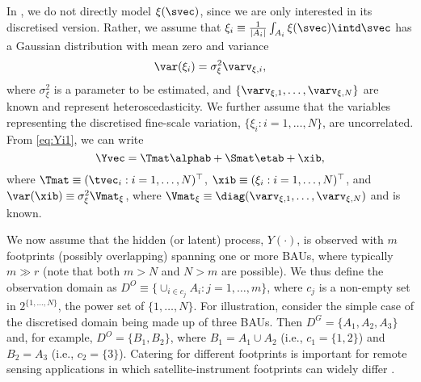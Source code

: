 In , we do not directly model $\xi(\svec)$, since we are only interested in its discretised version. Rather, we assume that $\xi_i \equiv \frac{1}{|A_i|}\int_{A_i} \xi(\svec)\intd\svec$ has a Gaussian distribution with mean zero and variance
\begin{equation*}
\var(\xi_i) = \sigma^2_\xi \varv_{\xi,i},
\end{equation*}
where $\sigma^2_\xi$ is a parameter to be estimated, and $\{\varv_{\xi,1},\dots,\varv_{\xi,N}\}$ are known and represent  heteroscedasticity. We further assume that the variables representing the discretised fine-scale variation, $\{\xi_i: i = 1,\dots,N\}$, are uncorrelated. From \eqref{eq:Yi1}, we can write
\begin{equation}\label{eq:SRE_Y}
\Yvec = \Tmat\alphab + \Smat\etab + \xib,
\end{equation}
where $\Tmat \equiv (\tvec_i: i = 1,\dots,N)^\top$, $\xib \equiv (\xi_i : i = 1,\dots,N)^\top$, and $\var(\xib) \equiv \sigma^2_\xi \Vmat_\xi$, where $\Vmat_\xi \equiv \diag(\varv_{\xi,1},\dots,\varv_{\xi,N})$ and is known.

We now  assume that the hidden (or latent) process, $Y(\cdot)$, is observed with $m$ footprints (possibly overlapping) spanning one or more BAUs, where typically $m \gg r$ (note that both $m > N$ and $N >m$ are possible). We thus define the observation domain as $D^O \equiv \{ \cup_{i \in c_j} A_i : j = 1,\dots,m \}$, where $c_j$ is a non-empty set in $2^{\{1,\dots,N\}}$, the power set of $\{1,\dots,N\}$. For illustration, consider the simple case of  the discretised domain being made up of three BAUs. Then $D^G = \{A_1,A_2,A_3\}$ and, for example, $D^O = \{B_1, B_2\}$, where $B_1 = A_1 \cup A_2$ (i.e., $c_1 = \{1,2\}$) and $B_2 = A_3$ (i.e., $c_2 = \{3\}$). Catering for different footprints is important for remote sensing applications in which satellite-instrument footprints can widely differ \citep[e.g.,][]{Zammit_2015}.

